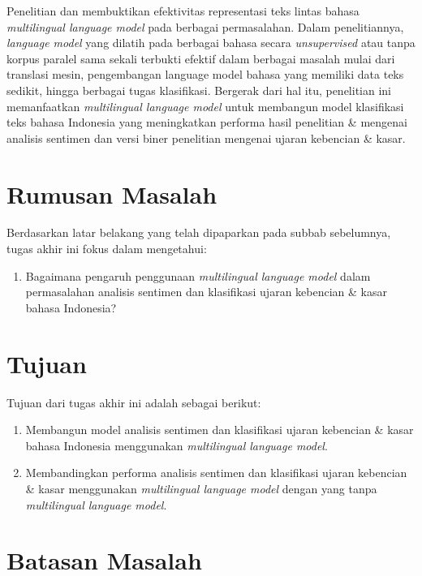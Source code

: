 Penelitian \parencite{Devlin_Chang_Lee_Toutanova_2019} dan \parencite{LampleConneau2019} membuktikan efektivitas representasi teks lintas bahasa \textit{multilingual language model} pada berbagai permasalahan. Dalam penelitiannya, \textit{language model} yang dilatih pada berbagai bahasa secara \textit{unsupervised} atau tanpa korpus paralel sama sekali terbukti efektif dalam berbagai masalah mulai dari translasi mesin, pengembangan language model bahasa yang memiliki data teks sedikit, hingga berbagai tugas klasifikasi. Bergerak dari hal itu, penelitian ini memanfaatkan \textit{multilingual language model} untuk membangun model klasifikasi teks bahasa Indonesia yang meningkatkan performa hasil penelitian \parencite{FarhanKhodra2017} \& \parencite{CrisdayantiPurwarianti2019} mengenai analisis sentimen dan versi biner penelitian \parencite{Ibrohim_Budi_2019} mengenai ujaran kebencian \& kasar. 

\section{Rumusan Masalah}

Berdasarkan latar belakang yang telah dipaparkan pada subbab sebelumnya, tugas akhir ini fokus dalam mengetahui: 
\begin{enumerate}
	\item Bagaimana pengaruh penggunaan \textit{multilingual language model} dalam permasalahan analisis sentimen dan klasifikasi ujaran kebencian \& kasar bahasa Indonesia?
\end{enumerate}

\section{Tujuan}

Tujuan dari tugas akhir ini adalah sebagai berikut:
\begin{enumerate}
	\item Membangun model analisis sentimen dan klasifikasi ujaran kebencian \& kasar bahasa Indonesia menggunakan \textit{multilingual language model}.
	\item Membandingkan performa analisis sentimen dan klasifikasi ujaran kebencian \& kasar menggunakan \textit{multilingual language model} dengan yang tanpa \textit{multilingual language model}.
\end{enumerate}

\section{Batasan Masalah}


